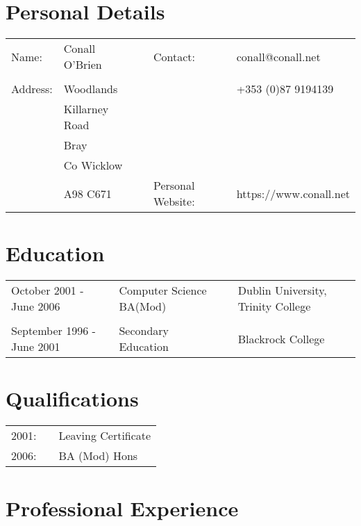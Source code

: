 \documentclass[a4paper, 11pt] {article}
\begin{document}
\section*{Personal Details}

\begin{tabular}{l l l l l}
Name: 	& Conall O'Brien		&	&	Contact: 			& conall@conall.net 	  	\\	
		&			&	&					&				\\
Address:	& Woodlands 		&	&					& +353 (0)87 9194139 		\\
		& Killarney Road	&	&					& 				\\
		& Bray			&	&					& 				\\
		& Co Wicklow		&	&					& 				\\
		& A98 C671 		&  	&	Personal Website:		& https://www.conall.net	\\
\end{tabular}

\section*{Education}

\begin{tabular}{l l l l}
October 2001 - June 2006	& Computer Science BA(Mod)	&	&	Dublin University, Trinity College \\
							&									&	&	\\
September 1996 - June 2001	& Secondary Education	&	&	Blackrock College	\\
\end{tabular}

\section*{Qualifications}

\begin{tabular}{l l l}
2001:		& 	&	Leaving Certificate 										\\
2006:		& 	&	BA (Mod) Hons												\\
\end{tabular}

\pagebreak

\section*{Professional Experience}
\end{document}
